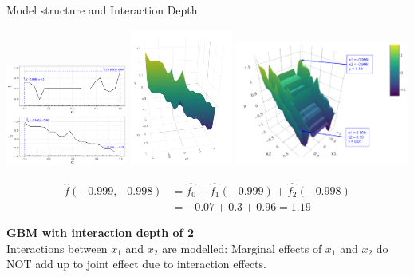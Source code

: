 \begin{vbframe}{Model structure and Interaction Depth}
\begin{center}
\includegraphics[width=0.3\textwidth]{figure_man/boosting_interaction_example_gam.png}
\includegraphics[width=0.25\textwidth]{figure_man/boosting_interaction_depth1fit3D_x2.png}
\includegraphics[width=0.43\textwidth]{figure/interaction_td1_d3.png}
\end{center}
\begin{align*}
\hat{f}(-0.999,-0.998) &= \hat{f_0} + \hat{f_1}(-0.999) + \hat{f_2}(-0.998)\\ 
&= -0.07 + 0.3 + 0.96 = 1.19
\end{align*}

\framebreak

\textbf{GBM with interaction depth of 2}\\
Interactions between $x_1$ and $x_2$ are modelled: Marginal effects of $x_1$ and $x_2$ do NOT add up to joint effect due to interaction effects.


\end{vbframe}
